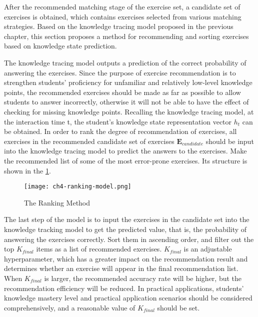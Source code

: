 After the recommended matching stage of the exercise set, a candidate set of exercises is obtained, which contains exercises selected from various matching strategies. Based on the knowledge tracing model proposed in the previous chapter, this section proposes a method for recommending and sorting exercises based on knowledge state prediction.

The knowledge tracing model outputs a prediction of the correct probability of answering the exercises. Since the purpose of exercise recommendation is to strengthen students' proficiency for unfamiliar and relatively low-level knowledge points, the recommended exercises should be made as far as possible to allow students to answer incorrectly, otherwise it will not be able to have the effect of checking for missing knowledge points. Recalling the knowledge tracing model, at the interaction time t, the student's knowledge state representation vector \(h_t\) can be obtained. In order to rank the degree of recommendation of exercises, all exercises in the recommended candidate set of exercises \(\mathbf{E}_{candidate}\) should be input into the knowledge tracing model to predict the answers to the exercises. Make the recommended list of some of the most error-prone exercises. Its structure is shown in the \figurename{\ref{fig:ch4-ranking-1}}.

\begin{figure}[h]
  \centering
  \texttt{[image: ch4-ranking-model.png]}
  \caption{The Ranking Method}\label{fig:ch4-ranking-1}
\end{figure}


The last step of the model is to input the exercises in the candidate set into the knowledge tracking model to get the predicted value, that is, the probability of answering the exercises correctly. Sort them in ascending order, and filter out the top \(K_{final}\) items as a list of recommended exercises. \(K_{final}\) is an adjustable hyperparameter, which has a greater impact on the recommendation result and determines whether an exercise will appear in the final recommendation list. When \(K_{final}\) is larger, the recommended accuracy rate will be higher, but the recommendation efficiency will be reduced. In practical applications, students’ knowledge mastery level and practical application scenarios should be considered comprehensively, and a reasonable value of \(K_{final}\) should be set.

